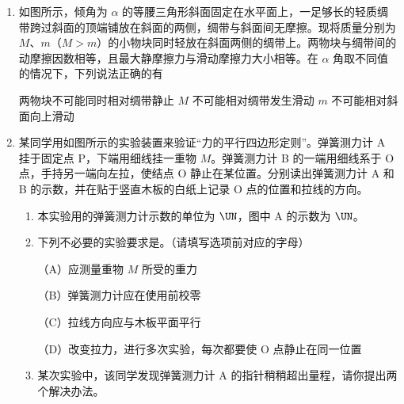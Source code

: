 \documentclass[\gkver]{gaokaozhenti}
\begin{document}
\begin{enumerate}
{
}

\item
如图所示，倾角为 $\alpha$ 的等腰三角形斜面固定在水平面上，一足够长的轻质绸带跨过斜面的顶端铺放在斜面的两侧，绸带与斜面间无摩擦。现将质量分别为 $M$、$m$（$M>m$）的小物块同时轻放在斜面两侧的绸带上。两物块与绸带间的动摩擦因数相等，且最大静摩擦力与滑动摩擦力大小相等。在 $\alpha$ 角取不同值的情况下，下列说法正确的有


{两物块不可能同时相对绸带静止}
{$M$ 不可能相对绸带发生滑动}
{$m$ 不可能相对斜面向上滑动}


\item
某同学用如图所示的实验装置来验证“力的平行四边形定则”。弹簧测力计 A 挂于固定点 P，下端用细线挂一重物 $M$。弹簧测力计 B 的一端用细线系于 O 点，手持另一端向左拉，使结点 O 静止在某位置。分别读出弹簧测力计 A 和 B 的示数，并在贴于竖直木板的白纸上记录 O 点的位置和拉线的方向。

\begin{enumerate}
	\item
	本实验用的弹簧测力计示数的单位为 $\UN$，图中 A 的示数为 $\UN$。
	\item
	下列不必要的实验要求是。（请填写选项前对应的字母）

	（A）应测量重物 $M$ 所受的重力

	（B）弹簧测力计应在使用前校零

	（C）拉线方向应与木板平面平行

	（D）改变拉力，进行多次实验，每次都要使 O 点静止在同一位置
	\item
	某次实验中，该同学发现弹簧测力计 A 的指针稍稍超出量程，请你提出两个解决办法。
\end{enumerate}


\end{enumerate}
\end{document}
